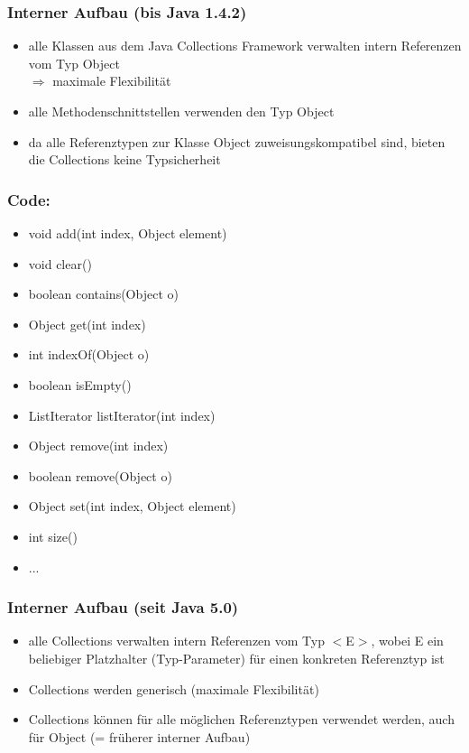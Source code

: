 \documentclass[a4paper,10pt]{article}
\begin{document}
\subsubsection{Interner Aufbau (bis Java 1.4.2)}
\begin{itemize}
	\item alle Klassen aus dem Java Collections Framework verwalten intern Referenzen vom Typ Object \\ $\Rightarrow$ maximale Flexibilit\"at
	\item alle Methodenschnittstellen verwenden den Typ Object
	\item da alle Referenztypen zur Klasse Object zuweisungskompatibel sind, bieten die Collections keine Typsicherheit
\end{itemize}

\subsubsection*{Code:}
\begin{itemize}
	\item void add(int index, Object element)
	\item void clear()
	\item boolean contains(Object o)
	\item Object get(int index)
	\item  int indexOf(Object o)
	\item boolean isEmpty()
	\item ListIterator listIterator(int index) 
	\item  Object remove(int index)
	\item boolean remove(Object o)
	\item Object set(int index, Object element) 
	\item  int size()
	\item ...
\end{itemize}

\subsubsection{Interner Aufbau (seit Java 5.0)}
\begin{itemize}
	\item alle Collections verwalten intern Referenzen vom Typ $<$E$>$, wobei E ein beliebiger Platzhalter (Typ-Parameter) f\"ur einen konkreten Referenztyp ist
	\item Collections werden generisch (maximale Flexibilit\"at)
	\item Collections k\"onnen f\"ur alle m\"oglichen Referenztypen verwendet werden, auch
f\"ur Object (= fr\"uherer interner Aufbau)
\end{itemize}
\end{document}
